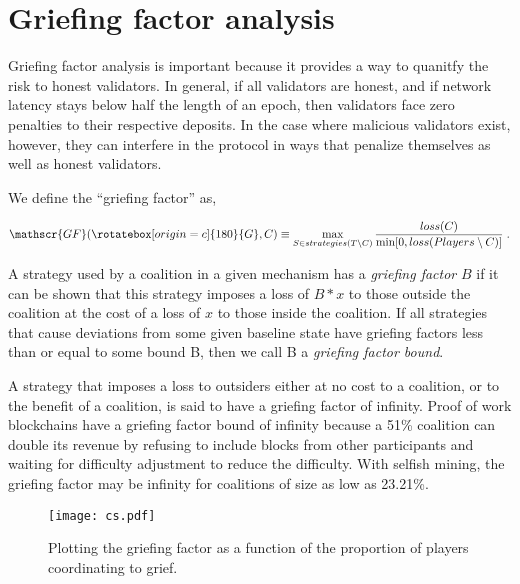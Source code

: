 \documentclass[12pt, final]{article}
\newcommand{\gamesymbol}{ \rotatebox[origin=c]{180}{G} }
\begin{document}
\section{Griefing factor analysis}

Griefing factor analysis is important because it provides a way to quanitfy the risk to honest validators. In general, if all validators are honest, and if network latency stays below half  the length of an epoch, then validators face zero penalties to their respective deposits.  In the case where malicious validators exist, however, they can interfere in the protocol in ways that penalize themselves as well as honest validators.

We define the ``griefing factor'' as,

\begin{equation}
\mathscr{GF}(\gamesymbol,C) \equiv \max_{S \in strategies(T \setminus C)} \frac{loss(C) }{\min[ 0, loss(Players \setminus C) ] } \; .
\end{equation}





\begin{definition}
A strategy used by a coalition in a given mechanism has a \emph{griefing factor} $B$ if it can be shown that this strategy imposes a loss of $B * x$ to those outside the coalition at the cost of a loss of $x$ to those inside the coalition. If all strategies that cause deviations from some given baseline state have griefing factors less than or equal to some bound B, then we call B a \emph{griefing factor bound}. 
\end{definition}

A strategy that imposes a loss to outsiders either at no cost to a coalition, or to the benefit of a coalition, is said to have a griefing factor of infinity. Proof of work blockchains have a griefing factor bound of infinity because a 51\% coalition can double its revenue by refusing to include blocks from other participants and waiting for difficulty adjustment to reduce the difficulty. With selfish mining, the griefing factor may be infinity for coalitions of size as low as 23.21\%. 



\begin{figure}[h!bt]
	\centering
	\texttt{[image: cs.pdf]}
	\caption{Plotting the griefing factor as a function of the proportion of players coordinating to grief.}
	\label{fig:GF}
\end{figure}
\end{document}
